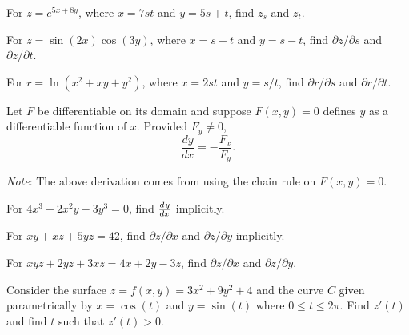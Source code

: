 \documentclass[../mathNotesPreamble]{subfiles}
\begin{document}
  \begin{ex*}
    For $z=e^{5x+8y}$, where $x=7st$ and $y=5s+t$, find $z_s$ and $z_t$.
  \end{ex*}
  \pagebreak

  \begin{ex*}
    For $z=\sin(2x)\cos(3y)$, where $x=s+t$ and $y=s-t$, find $\partial z/\partial s$ and $\partial z/\partial t$.
  \end{ex*}

  \begin{ex*}
    For $r=\ln(x^2+xy+y^2)$, where $x=2st$ and $y=s/t$, find $\partial r/\partial s$ and $\partial r/\partial t$.
  \end{ex*}
  \pagebreak

  \begin{thmBox*}
    Let $F$ be differentiable on its domain and suppose $F(x,y)=0$ defines $y$ as a differentiable function of $x$. Provided $F_y\neq 0$,
      \[\frac{dy}{dx}=-\frac{F_x}{F_y}.\]
  \end{thmBox*}
  
  \textit{Note}: The above derivation comes from using the chain rule on $F(x,y)=0$.
  \vspace*{2\baselineskip}
  \begin{ex*}
    For $4x^3+2x^2y-3y^3=0$, find ${\frac{d^{}y}{dx^{}}}$ implicitly.
  \end{ex*}
  \begin{ex*}
    For $xy+xz+5yz=42$, find $\partial z/\partial x$ and $\partial z/\partial y$ implicitly.
  \end{ex*}
  \pagebreak

  \begin{ex*}
    For $xyz+2yz+3xz=4x+2y-3z$, find $\partial z/\partial x$ and $\partial z/\partial y$.
  \end{ex*}

  \begin{ex*}
    Consider the surface $z=f(x,y)=3x^2+9y^2+4$ and the curve $C$ given parametrically by $x=\cos(t)$ and $y=\sin(t)$ where $0\leq t\leq 2\pi$. Find $z'(t)$ and find $t$ such that $z'(t)>0$.
  \end{ex*}

  \pagebreak
  
\end{document}
